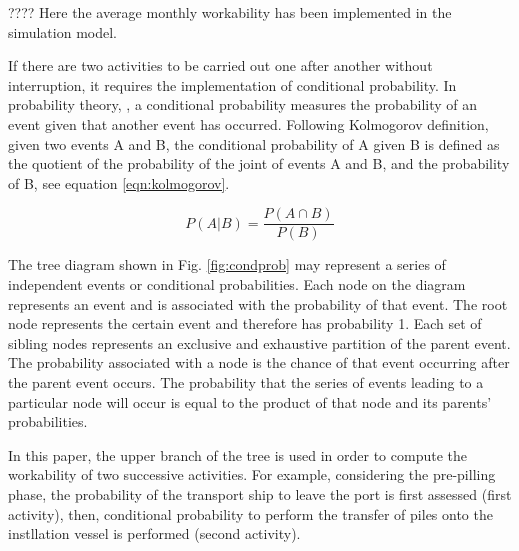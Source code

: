 ???? Here the average monthly workability has been implemented in the simulation model. 

If there are two activities to be carried out one after another without interruption, it requires the implementation of conditional probability.  
In probability theory, \cite{Thalemann2012}, a conditional probability measures the probability of an event given that another event has occurred. Following Kolmogorov definition, given two events A and B, the conditional probability of A given B is defined as the quotient of the probability of the joint of events A and B, and the probability of B, see equation \ref{eqn:kolmogorov}.

\begin{equation}
\label{eqn:kolmogorov}
P \left(A \vert B \right) = \frac{P \left(A \cap B \right)}{P \left( B \right)}
\end{equation}

The tree diagram shown in Fig. \ref{fig:condprob} may represent a series of independent events or conditional probabilities. Each node on the diagram represents an event and is associated with the probability of that event. The root node represents the certain event and therefore has probability 1. Each set of sibling nodes represents an exclusive and exhaustive partition of the parent event. The probability associated with a node is the chance of that event occurring after the parent event occurs. The probability that the series of events leading to a particular node will occur is equal to the product of that node and its parents' probabilities.

In this paper, the upper branch of the tree is used in order to compute the workability of two successive activities. For example, considering the pre-pilling phase, the probability of the transport ship to leave the port is first assessed (first activity), then, conditional probability to perform the transfer of piles onto the instllation vessel is performed (second activity).